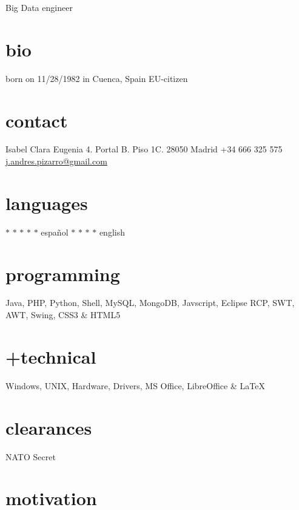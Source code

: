 \documentclass[]{friggeri-cv}
\begin{document}
       {Big Data engineer}



\begin{aside} %
  \section{bio}
  born on 11/28/1982
  in Cuenca, Spain
  EU-citizen
  \section{contact}
  Isabel Clara Eugenia 4. 
  Portal B. Piso 1C.
  28050 Madrid
  +34 666 325 575
  \hyperref[mailto:j.andres.pizarro@gmail.com]{j.andres.pizarro@gmail.com}
  \section{languages}
  {\color{lightgray} $\ast$}{\color{lightgray} $\ast$}{\color{lightgray} $\ast$}{\color{lightgray} $\ast$}{\color{lightgray} $\ast$} español
  {\color{lightgray} $\ast$}{\color{lightgray} $\ast$}{\color{lightgray} $\ast$}{\color{lightgray} $\ast$} english
  \section{programming}
  Java, PHP, Python, Shell,
  MySQL, MongoDB, Javscript,
  Eclipse RCP, SWT, AWT, Swing,
  CSS3 \& HTML5
  \section{ +technical}
  Windows, UNIX,
  Hardware, Drivers,
  MS Office, LibreOffice \& \LaTeX
  \section{clearances}
  NATO Secret
\end{aside}


\section{motivation}
\end{document}

